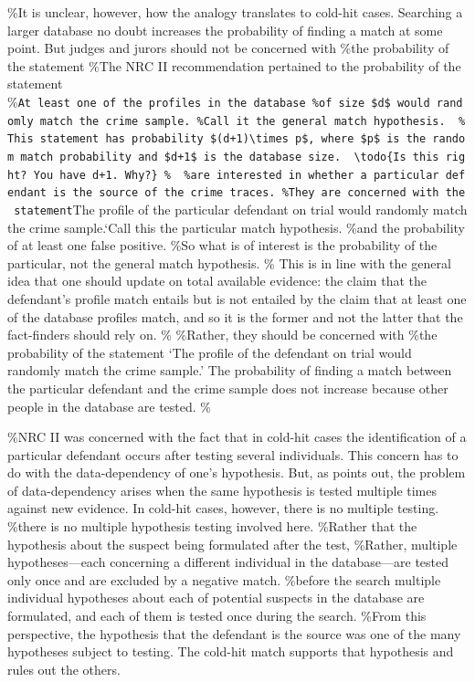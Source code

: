 \documentclass[10pt,dvipsnames,enabledeprecatedfontcommands]{scrartcl}
\begin{document}
\%It is unclear, however, how the analogy translates to cold-hit cases.
Searching a larger database no doubt increases the probability of
finding a match at some point. But judges and jurors should not be
concerned with \%the probability of the statement \%The NRC II
recommendation pertained to the probability of the statement
\%\texttt{At\ least\ one\ of\ the\ profiles\ in\ the\ database\ \%of\ size\ \$d\$\ would\ randomly\ match\ the\ crime\ sample.\textquotesingle{}\ \%Call\ it\ the\ general\ match\ hypothesis.\ \ \%This\ statement\ has\ probability\ \$(d+1)\textbackslash{}times\ p\$,\ where\ \$p\$\ is\ the\ random\ match\ probability\ and\ \$d+1\$\ is\ the\ database\ size.\ \ \textbackslash{}todo\{Is\ this\ right?\ You\ have\ d+1.\ Why?\}\ \%\ \ \%are\ interested\ in\ whether\ a\ particular\ defendant\ is\ the\ source\ of\ the\ crime\ traces.\ \%They\ are\ concerned\ with\ the\ statement}The
profile of the particular defendant on trial would randomly match the
crime sample.`Call this the particular match hypothesis. \%and the
probability of at least one false positive. \%So what is of interest is
the probability of the particular, not the general match hypothesis. \%
This is in line with the general idea that one should update on total
available evidence: the claim that the defendant's profile match entails
but is not entailed by the claim that at least one of the database
profiles match, and so it is the former and not the latter that the
fact-finders should rely on. \% \%Rather, they should be concerned with
\%the probability of the statement `The profile of the defendant on
trial would randomly match the crime sample.' The probability of finding
a match between the particular defendant and the crime sample does not
increase because other people in the database are tested. \%

\%NRC II was concerned with the fact that in cold-hit cases the
identification of a particular defendant occurs after testing several
individuals. This concern has to do with the data-dependency of one's
hypothesis. But, as \citet{balding2002DNDatabaseSearch} points out, the
problem of data-dependency arises when the same hypothesis is tested
multiple times against new evidence. In cold-hit cases, however, there
is no multiple testing. \%there is no multiple hypothesis testing
involved here. \%Rather that the hypothesis about the suspect being
formulated after the test, \%Rather, multiple hypotheses---each
concerning a different individual in the database---are tested only once
and are excluded by a negative match. \%before the search multiple
individual hypotheses about each of potential suspects in the database
are formulated, and each of them is tested once during the search.
\%From this perspective, the hypothesis that the defendant is the source
was one of the many hypotheses subject to testing. The cold-hit match
supports that hypothesis and rules out the others.
\end{document}
